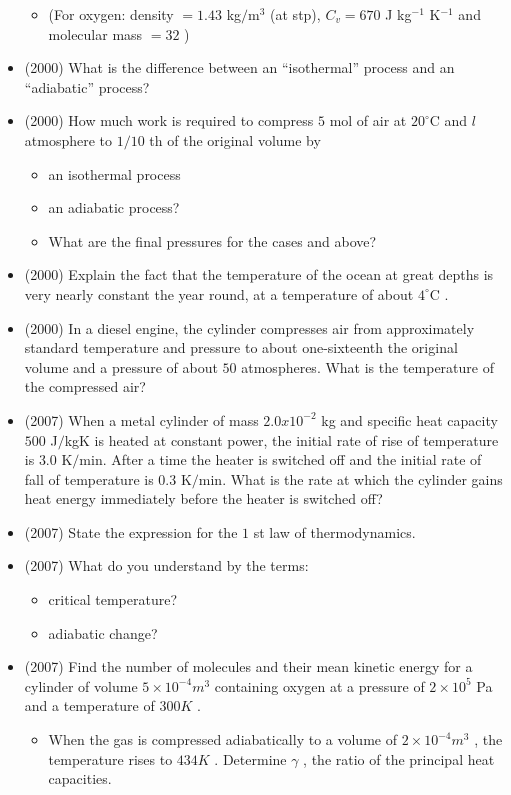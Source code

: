 \documentclass{article}
\begin{document}
\begin{itemize}
\begin{itemize}
\item (For oxygen: density $ =1.43$ kg$/$m$ ^{3}$ (at stp), $ C_v =670$ J kg$ ^{-1}$ K$ ^{-1}$ and molecular mass $ =32$ )
\end{itemize}
\item (2000)  What is the difference between an “isothermal” process and an “adiabatic” process?
\item (2000)  How much work is required to compress $ 5$ mol of air at $ 20^{\circ}$C and $ l$ atmosphere to $ 1/10$ th of the original volume by
 \begin{itemize}
\item an isothermal process
\item an adiabatic process?
\item What are the final pressures for the cases and above?
\end{itemize}
\item (2000)  Explain the fact that the temperature of the ocean at great depths is very nearly constant the year round, at a temperature of about $ 4^{\circ}$C .
\item (2000)  In a diesel engine, the cylinder compresses air from approximately standard temperature and pressure to about one-sixteenth the original volume and a pressure of about $ 50$ atmospheres. What is the temperature of the compressed air?
\item (2007)  When a metal cylinder of mass $ 2.0x10^{-2}$ kg and specific heat capacity $ 500$ J$/$kgK is heated at constant power, the initial rate of rise of temperature is $ 3.0$ K$/$min.  After a time the heater is switched off and the initial rate of fall of temperature is $ 0.3$ K$/$min.  What is the rate at which the cylinder gains heat energy immediately before the heater is switched off?
\item (2007)  State the expression for the $ 1$ st law of thermodynamics.
\item (2007)  What do you understand by the terms:
 \begin{itemize}
\item critical temperature? 
\item adiabatic change?
\end{itemize}
\item (2007)  Find the number of molecules and their mean kinetic energy for a cylinder of volume $ 5 \times 10^{-4}m^{3}$ containing oxygen at a pressure of $ 2 \times 10^{5}$ Pa and a temperature of $ 300K$ . 
 \begin{itemize}
\item When the gas is compressed adiabatically to a volume of $ 2 \times 10^{-4}m^{3}$ , the temperature rises to $ 434K$ . Determine $ \gamma $ , the ratio of the principal heat capacities.

\end{itemize}
\end{itemize}
\end{document}
